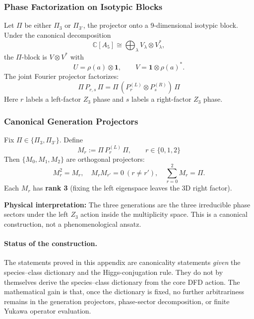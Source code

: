 \subsubsection{Phase Factorization on Isotypic Blocks}

\begin{proposition}\label{prop:phase-factorization}
Let $\Pi$ be either $\Pi_3$ or $\Pi_{3'}$, the projector onto a 9-dimensional 
isotypic block. Under the canonical decomposition
\begin{equation}
\mathbb{C}[A_5] \cong \bigoplus_{\lambda} V_\lambda \otimes V_\lambda^{*},
\end{equation}
the $\Pi$-block is $V \otimes V^{*}$ with
\begin{equation}
U = \rho(a) \otimes \mathbf{1}, \qquad V = \mathbf{1} \otimes \rho(a)^{*}.
\end{equation}
The joint Fourier projector factorizes:
\begin{equation}
\boxed{\Pi\,P_{r,s}\,\Pi = \Pi\,(P^{(L)}_{r} \otimes P^{(R)}_{s})\,\Pi}
\end{equation}
Here $r$ labels a left-factor $Z_3$ phase and $s$ labels a right-factor $Z_3$ phase.
\end{proposition}

\subsubsection{Canonical Generation Projectors}

\begin{proposition}\label{prop:generation-projectors}
Fix $\Pi \in \{\Pi_3, \Pi_{3'}\}$. Define
\begin{equation}
\boxed{M_r := \Pi\,P^{(L)}_{r}\,\Pi, \qquad r \in \{0,1,2\}}
\end{equation}
Then $\{M_0, M_1, M_2\}$ are orthogonal projectors:
\begin{equation}
M_r^2 = M_r, \quad M_r M_{r'} = 0\ (r \neq r'), \quad \sum_{r=0}^{2} M_r = \Pi.
\end{equation}
Each $M_r$ has \textbf{rank 3} (fixing the left eigenspace leaves the 3D right factor).
\end{proposition}

\textbf{Physical interpretation:} The three generations are the three irreducible 
phase sectors under the left $Z_3$ action inside the multiplicity space. This is 
a canonical construction, not a phenomenological ansatz.

\paragraph{Status of the construction.}
The statements proved in this appendix are canonicality statements \emph{given} the species--class dictionary and the Higgs-conjugation rule.  They do not by themselves derive the species--class dictionary from the core DFD action.  The mathematical gain is that, once the dictionary is fixed, no further arbitrariness remains in the generation projectors, phase-sector decomposition, or finite Yukawa operator evaluation.

